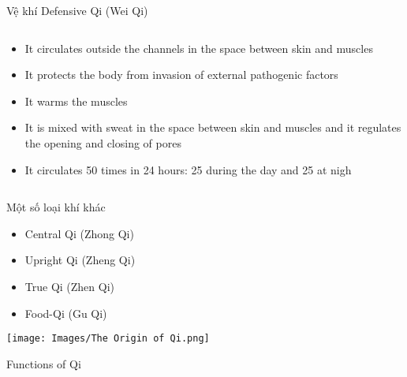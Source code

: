 \documentclass[
	11pt, %
]{beamer}
\theoremstyle{newblock}
\begin{document}
\begin{frame}{Vệ khí Defensive Qi (Wei Qi)}
\begin{columns}[T]
{\begin{block}{}
\begin{itemize}
					\item It circulates outside the channels in the space between skin and muscles
					\item It protects the body from invasion of external pathogenic 
					factors
					\item It warms the muscles
					\item It is mixed with sweat in the space between skin and 
					muscles and it regulates the opening and closing of pores
					\item It circulates 50 times in 24 hours: 25 during the day and 25 at nigh
				\end{itemize}	
			\end{block}
		}
	\end{columns}
\end{frame}
\begin{frame}{Một số loại khí khác}
	\begin{itemize}
		\item Central Qi (Zhong Qi)
		\item Upright Qi (Zheng Qi) 
		\item True Qi (Zhen Qi)
		\item Food-Qi (Gu Qi) 
	\end{itemize}
\end{frame}
\begin{frame}
	\texttt{[image: Images/The Origin of Qi.png]}
\end{frame}
\begin{frame}
	\Huge{Functions of Qi}\\
\end{frame}
\end{document}
